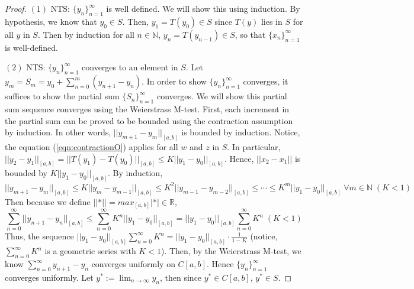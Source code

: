 \documentclass{article}
\theoremstyle{definition}
\theoremstyle{remark}
\theoremstyle{example}
\begin{document}
\begin{proof}
    \cite{r_kent_nagle_fundamentals_2011}$(1)$ NTS: $\{y_n\}_{n = 1}^{\infty}$ is well defined. \; We will show this using induction. By hypothesis, we know that $y_0 \in S$. Then, $y_1 = T(y_0) \in S$ since $T(y)$ lies in $S$ for all $y$ in $S$. Then by induction for all $n \in \mathbb{N}$, $y_n = T(y_{n-1}) \in S$, so that $\{x_n\}_{n = 1}^{\infty}$ is well-defined.
    
    $(2)$ NTS: $\{y_n\}_{n = 1}^{\infty}$ converges to an element in $S$. \; Let $y_m = S_m = y_0 + \sum_{n = 0}^{m}(y_{n+1} - y_n)$. In order to show $\{y_n\}_{n = 1}^{\infty}$ converges, it suffices to show the partial sum $\{S_n\}_{n = 1}^{\infty}$ converges. We will show this partial sum sequence converges using the Weierstrass M-test. First, each increment in the partial sum can be proved to be bounded using the contraction assumption by induction. In other words, $\lvert\lvert y_{m+1} - y_{m}\rvert\rvert_{[a,b]}$ is bounded by induction. Notice, the equation (\ref{eqn:contractionO}) applies for all $w$ and $z$ in $S$. In particular, $\lvert\lvert y_2 - y_1 \rvert\rvert_{[a,b]} = \lvert\lvert T(y_1) - T(y_0) \rvert\rvert_{[a,b]} \leq K \lvert\lvert y_1 - y_0 \rvert\rvert_{[a,b]}$. Hence, $\lvert\lvert x_2 - x_1 \rvert\rvert$ is bounded by $K \lvert\lvert y_1 - y_0 \rvert\rvert_{[a,b]}$. By induction,
    \begin{equation}
        \lvert\lvert y_{m+1} - y_{m} \rvert\rvert_{[a,b]} \leq K \lvert\lvert y_m - y_{m-1} \rvert\rvert_{[a,b]} \leq K^2 \lvert\lvert y_{m-1} - y_{m-2} \rvert\rvert_{[a,b]} \leq \cdots \leq K^m\lvert\lvert y_1 - y_0 \rvert\rvert_{[a,b]} \; \forall m \in \mathbb{N} \; (K < 1)
    \end{equation}
   Then because we define $\lvert\lvert * \rvert\rvert = max_{[a,b]}\lvert * \rvert \in \mathbb{R}$,
    \begin{equation}\label{eqn:comparison}
        \sum_{n = 0}^{\infty}{\lvert\lvert y_{n+1} - y_n \rvert\rvert_{[a,b]}} \leq \sum_{n = 0}^{\infty}{K^n\lvert\lvert y_1 - y_0 \rvert\rvert_{[a,b]}} = \lvert\lvert y_1 - y_0 \rvert\rvert_{[a,b]} \sum_{n = 0}^{\infty}{K^n} \; (K < 1)
    \end{equation}
    Thus, the sequence $\lvert\lvert y_1 - y_0 \rvert\rvert_{[a,b]} \sum_{n = 0}^{\infty}{K^n} = \lvert\lvert y_1 - y_0 \rvert\rvert_{[a,b]} \cdot \tfrac{1}{1-K}$ (notice, $\sum_{n = 0}^{\infty}{K^n}$ is a geometric series with $K < 1$). Then, by the Weierstrass M-test, we know $\sum_{n = 0}^{\infty}{y_{n+1} - y_n}$ converges uniformly on $C[a,b]$. Hence $\{y_n\}_{n = 1}^{\infty}$ converges uniformly. Let $y^{*} := \lim_{n \to \infty}{y_n}$, then since $y^{*} \in C[a,b]$, $y^{*} \in S$.
    

\end{proof}
\end{document}
